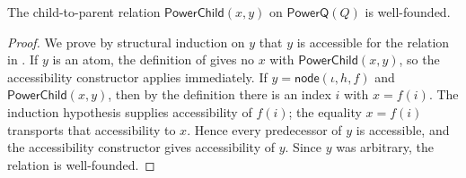 \begin{lemma}
The child-to-parent relation
$\mathsf{PowerChild}(x,y)$ on $\mathsf{PowerQ}(Q)$ is well-founded.
\end{lemma}
\begin{proof}
We prove by structural induction on $y$ that $y$ is accessible for the
relation in .  If $y$ is an atom, the definition of
 gives no $x$ with $\mathsf{PowerChild}(x,y)$, so the
accessibility constructor applies immediately.  If
$y=\mathsf{node}(\iota,h,f)$ and
$\mathsf{PowerChild}(x,y)$, then by the definition there is an index $i$
with $x=f(i)$.  The induction hypothesis supplies accessibility of $f(i)$;
the equality $x=f(i)$ transports that accessibility to $x$.  Hence every
predecessor of $y$ is accessible, and the accessibility constructor gives
accessibility of $y$.  Since $y$ was arbitrary, the relation is well-founded.
\end{proof}
